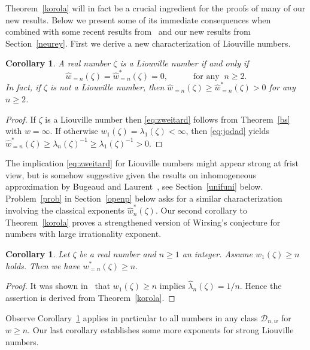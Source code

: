 \documentclass[12pt]{amsart}
\newtheorem{corollary}[theorem]{Corollary}
\theoremstyle{definition}
\begin{document}
Theorem~\ref{korola} will in fact be a crucial ingredient 
for the proofs of many of our new results. Below
we present some of its immediate consequences when
combined with some recent results from~\cite{j3} and our new results
from Section~\ref{neurey}. 
First we derive a new characterization of
Liouville numbers.

\begin{corollary} \label{najor}
A real number  $\zeta$ is a Liouville number if and only if
%
\begin{equation} \label{eq:zweitard}
\widehat{w}_{=n}(\zeta)=\widehat{w}_{=n}^{\ast}(\zeta)=0, 
\qquad\quad \text{for any} \;\; n\geq 2.
\end{equation}
%
In fact, if $\zeta$ is not a Liouville number, then 
$\widehat{w}_{=n}(\zeta)\geq \widehat{w}_{=n}^{\ast}(\zeta)>0$
for any $n\geq 2$.
\end{corollary}

\begin{proof}
If $\zeta$ is a Liouville number then \eqref{eq:zweitard} follows from Theorem~\ref{bs} with $w=\infty$.
If otherwise $w_{1}(\zeta)=\lambda_{1}(\zeta)<\infty$, then \eqref{eq:jodad} yields 
$\widehat{w}_{=n}^{\ast}(\zeta)\geq \lambda_{n}(\zeta)^{-1}\geq \lambda_{1}(\zeta)^{-1}>0$.
\end{proof}

The implication \eqref{eq:zweitard} for Liouville numbers might
appear strong at frist view, but is somehow 
suggestive given the results on inhomogeneous approximation 
by Bugeaud and Laurent~\cite{bula}, see Section~\ref{unifuni} below.
Problem~\ref{prob} in Section~\ref{openp} below asks for a similar characterization involving
the classical exponents $\widehat{w}_{n}^{\ast}(\zeta)$. 
Our second corollary to Theorem~\ref{korola} 
proves a strengthened version of Wirsing's conjecture for numbers with large irrationality exponent.

\begin{corollary} \label{clintonh}
Let $\zeta$ be a real number and $n\geq 1$ an integer. Assume $w_{1}(\zeta)\geq n$ holds. Then
we have $w_{=n}^{\ast}(\zeta)\geq n$.
\end{corollary}

\begin{proof}
It was shown in~\cite[Theorem~1.12]{j3} that $w_{1}(\zeta)\geq n$ implies $\widehat{\lambda}_{n}(\zeta)=1/n$.
Hence the assertion is derived from Theorem~\ref{korola}.
\end{proof}

Observe Corollary~\ref{clintonh} applies in particular to all numbers in any class $\mathscr{D}_{n,w}$ for $w\geq n$.
Our last corollary establishes some more exponents for strong Liouville numbers.
\end{document}

